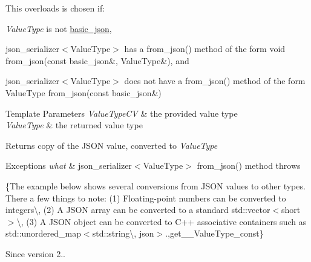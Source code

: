 This overloads is chosen if\+:
\begin{DoxyItemize}
\item {\itshape Value\+Type} is not \mbox{\hyperlink{classnlohmann_1_1basic__json}{basic\+\_\+json}},
\item json\+\_\+serializer$<$\+Value\+Type$>$ has a {\ttfamily from\+\_\+json()} method of the form {\ttfamily void from\+\_\+json(const basic\+\_\+json\&, Value\+Type\&)}, and
\item json\+\_\+serializer$<$\+Value\+Type$>$ does not have a {\ttfamily from\+\_\+json()} method of the form {\ttfamily Value\+Type from\+\_\+json(const basic\+\_\+json\&)}
\end{DoxyItemize}


\begin{DoxyTemplParams}{Template Parameters}
{\em Value\+Type\+CV} & the provided value type \\
\hline
{\em Value\+Type} & the returned value type\\
\hline
\end{DoxyTemplParams}
\begin{DoxyReturn}{Returns}
copy of the J\+S\+ON value, converted to {\itshape Value\+Type} 
\end{DoxyReturn}

\begin{DoxyExceptions}{Exceptions}
{\em what} & json\+\_\+serializer$<$\+Value\+Type$>$ {\ttfamily from\+\_\+json()} method throws\\
\hline
\end{DoxyExceptions}
\{The example below shows several conversions from J\+S\+ON values to other types. There a few things to note\+: (1) Floating-\/point numbers can be converted to integers\textbackslash{}, (2) A J\+S\+ON array can be converted to a standard {\ttfamily std\+::vector$<$short$>$}\textbackslash{}, (3) A J\+S\+ON object can be converted to C++ associative containers such as {\ttfamily std\+::unordered\+\_\+map$<$std\+::string\textbackslash{}, json$>$}.,get\+\_\+\+\_\+\+Value\+Type\+\_\+const\}

\begin{DoxySince}{Since}
version 2.. 
\end{DoxySince}
\mbox{\label{classnlohmann_1_1basic__json_a32a3ee3b99cc5d3ba67bc52148e98cb5}} 
